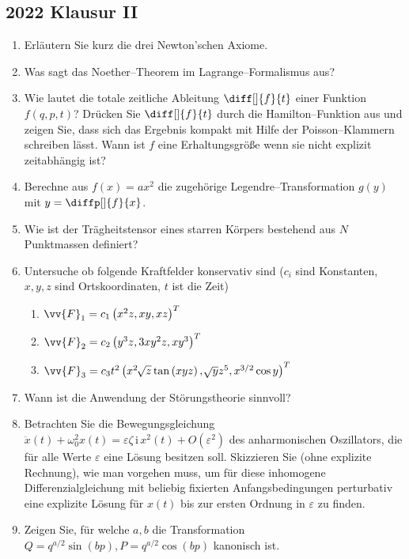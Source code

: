 \documentclass[a4paper,12pt]{article}
\numberwithin{equation}{section}
\begin{document}
\subsection{2022 Klausur II}
\begin{enumerate}[label=\arabic*.]
        \item Erläutern Sie kurz die drei Newton'schen Axiome.
        \item Was sagt das Noether--Theorem im Lagrange--Formalismus aus?
        \item Wie lautet die totale zeitliche Ableitung $\diff[]{f}{t}$ einer Funktion $f\left(q,p,t\right)$? Drücken Sie $\diff[]{f}{t}$ durch die Hamilton--Funktion aus und zeigen Sie, dass sich das Ergebnis kompakt mit Hilfe der Poisson--Klammern schreiben lässt. Wann ist $f$ eine Erhaltungsgröße wenn sie nicht explizit zeitabhängig ist?
        \item Berechne aus $f\left(x\right)=ax^2$ die zugehörige Legendre--Transformation $g\left(y\right)$ mit $y=\diffp[]{f}{x}$.
        \item Wie ist der Trägheitstensor eines starren Körpers bestehend aus $N$ Punktmassen definiert?
        \item Untersuche ob folgende Kraftfelder konservativ sind ($c_i$ sind Konstanten, $x,y,z$ sind Ortskoordinaten, $t$ ist die Zeit)
                \begin{enumerate}[label=\roman*.]
                        \item $\vv{F}_1=c_1\left(x^2z,xy,xz\right)^T$ 
                        \item $\vv{F}_2=c_2\left(y^3z,3xy^2z,xy^3\right)^T$ 
                        \item $\vv{F}_3=c_3t^2\left(x^2\,\sqrt[]{z}\tan \left(xyz\right),\,\sqrt[]{y}z^5,x^{3/2}\cos y\right)^T$ 
                \end{enumerate}
        \item Wann ist die Anwendung der Störungstheorie sinnvoll?
        \item Betrachten Sie die Bewegungsgleichung $\ddot{x}\left(t\right)+\omega ^2_0x\left(t\right)=\varepsilon \zeta \,\text{i}\,x^2\left(t\right)+O\left(\varepsilon ^2\right)$ des anharmonischen Oszillators, die für alle Werte $\varepsilon $ eine Lösung besitzen soll. Skizzieren Sie (ohne explizite Rechnung), wie man vorgehen muss, um für diese inhomogene Differenzialgleichung mit beliebig fixierten Anfangsbedingungen perturbativ eine explizite Lösung für $x\left(t\right)$ bis zur ersten Ordnung in $\varepsilon $ zu finden.
        \item Zeigen Sie, für welche $a,b$ die Transformation $Q=q ^{a/2}\sin \left(bp\right),P= q ^{a/2}\cos \left(bp\right)$ kanonisch ist.
\end{enumerate}
\end{document}
